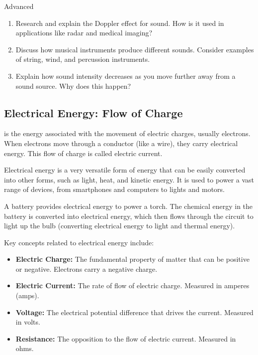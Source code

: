 \begin{tieredquestions}{Advanced}
\begin{enumerate}
    \item Research and explain the Doppler effect for sound. How is it used in applications like radar and medical imaging?
    \item Discuss how musical instruments produce different sounds. Consider examples of string, wind, and percussion instruments.
    \item Explain how sound intensity decreases as you move further away from a sound source. Why does this happen?
\end{enumerate}
\end{tieredquestions}


\subsection{Electrical Energy: Flow of Charge}

 is the energy associated with the movement of electric charges, usually electrons.  When electrons move through a conductor (like a wire), they carry electrical energy.  This flow of charge is called electric current.


Electrical energy is a very versatile form of energy that can be easily converted into other forms, such as light, heat, and kinetic energy.  It is used to power a vast range of devices, from smartphones and computers to lights and motors.

\begin{example}
A battery provides electrical energy to power a torch. The chemical energy in the battery is converted into electrical energy, which then flows through the circuit to light up the bulb (converting electrical energy to light and thermal energy).
\end{example}

Key concepts related to electrical energy include:

\begin{itemize}
    \item \textbf{Electric Charge:}  The fundamental property of matter that can be positive or negative.  Electrons carry a negative charge.
    \item \textbf{Electric Current:} The rate of flow of electric charge. Measured in amperes (amps).
    \item \textbf{Voltage:} The electrical potential difference that drives the current. Measured in volts.
    \item \textbf{Resistance:}  The opposition to the flow of electric current. Measured in ohms.
\end{itemize}

